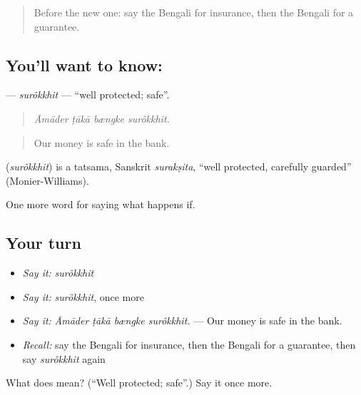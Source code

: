 \begin{quote}
Before the new one: say the Bengali for insurance, then the Bengali for a guarantee.
\end{quote}

\subsection*{You'll want to know: }
\textbf{} — \emph{surôkkhit} — \textquotedblleft{}well protected; safe\textquotedblright{}.

\begin{quote}
   
\end{quote}

\begin{quote}
\emph{Āmāder ṭākā bængke surôkkhit.}
\end{quote}

\begin{quote}
Our money is safe in the bank.
\end{quote}

\begin{cousinweb}
\textbf{} (\emph{surôkkhit}) is a tatsama, Sanskrit \emph{surakṣita}, \textquotedblleft{}well protected, carefully guarded\textquotedblright{} (Monier-Williams).
\end{cousinweb}

\begin{grammarlens}[title={What you've built}]
One more word for saying what happens if.
\end{grammarlens}

\subsection*{Your turn}
\begin{itemize}
\raggedright
  \item \emph{Say it:} \emph{surôkkhit}
  \item \emph{Say it:} \emph{surôkkhit}, once more
  \item \emph{Say it:} \emph{Āmāder ṭākā bængke surôkkhit.} — Our money is safe in the bank.
  \item \emph{Recall:} say the Bengali for insurance, then the Bengali for a guarantee, then say \emph{surôkkhit} again
\end{itemize}

\begin{tcolorbox}[breakable,colback=teal!4,colframe=teal!35!black,title={Before you move on}]
What does  mean? (\textquotedblleft{}Well protected; safe\textquotedblright{}.) Say it once more.
\end{tcolorbox}
